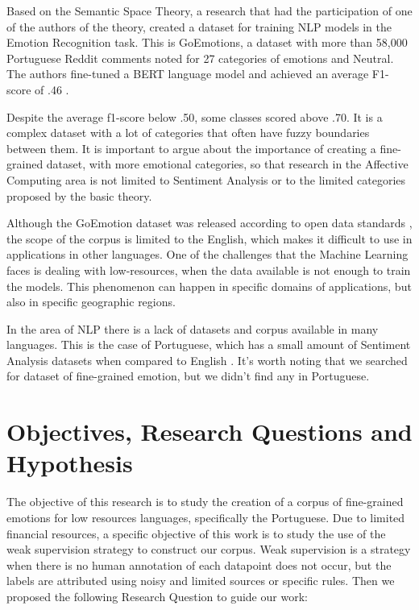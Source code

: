 \documentclass[12pt]{article}
\begin{document}
Based on the Semantic Space Theory, a research that had the participation of one of the authors of the theory, created a dataset for training NLP models in the Emotion Recognition task. This is GoEmotions, a dataset with more than 58,000 Portuguese Reddit comments noted for 27 categories of emotions and Neutral. The authors fine-tuned a BERT language model and achieved an average F1-score of .46 \cite{Demszky2020}.

Despite the average f1-score below .50, some classes scored above .70. It is a complex dataset with a lot of categories that often have fuzzy boundaries between them. It is important to argue about the importance of creating a fine-grained dataset, with more emotional categories, so that research in the Affective Computing area is not limited to Sentiment Analysis or to the limited categories proposed by the basic theory.

Although the GoEmotion dataset was released according to open data standards \cite{Demszky2020}, the scope of the corpus is limited to the English, which makes it difficult to use in applications in other languages. One of the challenges that the Machine Learning faces is dealing with low-resources, when the data available is not enough to train the models. This phenomenon can happen in specific domains of applications, but also in specific geographic regions.

In the area of NLP there is a lack of datasets and corpus available in many languages. This is the case of Portuguese, which has a small amount of Sentiment Analysis datasets when compared to English \cite{Pereira2021}. It's worth noting that we searched for dataset of fine-grained emotion, but we didn't find any in Portuguese.

\section{Objectives, Research Questions and Hypothesis}
\label{sec:objectives}

The objective of this research is to study the creation of a corpus of fine-grained emotions for low resources languages, specifically the Portuguese. Due to limited financial resources, a specific objective of this work is to study the use of the weak supervision strategy to construct our corpus. Weak supervision is a strategy when there is no human annotation of each datapoint does not occur, but the labels are attributed using noisy and limited sources or specific rules. Then we proposed the following Research Question to guide our work:
\end{document}
